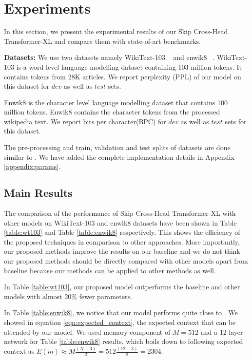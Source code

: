 \documentclass[11pt]{article}
\begin{document}
\section{Experiments}
\label{Experiments}




In this section, we present the experimental results of our Skip Cross-Head Transformer-XL and compare them with state-of-art benchmarks.


\textbf{Datasets:} We use two datasets namely WikiText-103 ~\citep{DBLP:conf/iclr/MerityX0S17} and enwik8 ~\citep{mahoney2011large}. WikiText-103 is a word level language modelling dataset containing 103 million tokens. It contains tokens from 28K articles. We report perplexity (PPL) of our model on this dataset for $dev$ as well as $test$ sets. 


Enwik8 is the character level language modelling dataset that contains 100 million tokens. Enwik8 contains the character tokens from the processed wikipedia text.  We report bits per character(BPC) for $dev$ as well as $test$ sets for this dataset.

The pre-processing and train, validation and test splits of datasets are done similar to \citet{DBLP:conf/acl/DaiYYCLS19}. We have added the complete implementation details in Appendix \ref{appendix:params}.


\subsection{Main Results}

The comparison of the performance of Skip Cross-Head Transformer-XL with other models on WikiText-103 and enwik8 datasets have been shown in Table \ref{table:wt103} and Table \ref{table:enwik8} respectively. This shows the efficiency of the proposed techniques in comparison to other approaches. More importantly, our proposed methods improve the results on our baseline and we do not think our proposed methods should be directly compared with other models apart from baseline because our methods can be applied to other methods as well.

In Table \ref{table:wt103}, our proposed model outperforms the baseline and other models with almost 20\% fewer parameters.

In Table \ref{table:enwik8}, we notice that our model performs quite close to \citep{DBLP:conf/acl/SukhbaatarGBJ19}. We showed in equation \ref{eqn:expected_context}, the expected context that can be attended by our model. We used memory component of $M=512$ and a 12 layer network for Table \ref{table:enwik8} results, which boils down to following expected context as
$
     E(\widetilde{m})  \approx  M \frac{(N-3)}{2} = 512 \frac{(12-3)}{2} = 2304
$.
\end{document}
